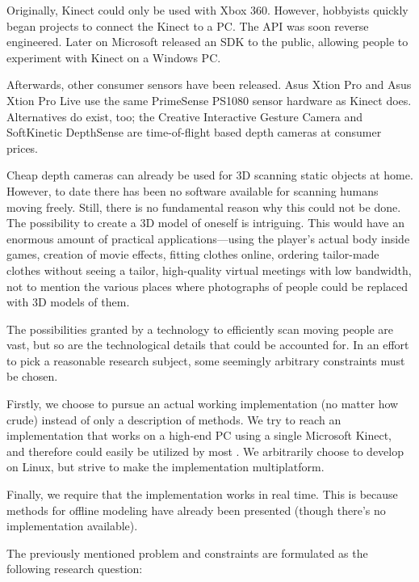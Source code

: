 Originally, Kinect could only be used with Xbox 360. However, hobbyists quickly began projects to connect the Kinect to a PC. The API was soon reverse engineered. Later on Microsoft released an SDK to the public, allowing people to experiment with Kinect on a Windows PC.

Afterwards, other consumer sensors have been released. Asus Xtion Pro and Asus Xtion Pro Live use the same PrimeSense PS1080 sensor hardware as Kinect does. Alternatives do exist, too; the Creative Interactive Gesture Camera and SoftKinetic DepthSense are time-of-flight based depth cameras at consumer prices.

Cheap depth cameras can already be used for 3D scanning static objects at home. However, to date there has been no software available for scanning humans moving freely. Still, there is no fundamental reason why this could not be done. The possibility to create a 3D model of oneself is intriguing. This would have an enormous amount of practical applications---using the player's actual body inside games, creation of movie effects, fitting clothes online, ordering tailor-made clothes without seeing a tailor, high-quality virtual meetings with low bandwidth, not to mention the various places where photographs of people could be replaced with 3D models of them.


The possibilities granted by a technology to efficiently scan moving people are vast, but so are the technological details that could be accounted for. In an effort to pick a reasonable research subject, some seemingly arbitrary constraints must be chosen.

Firstly, we choose to pursue an actual working implementation (no matter how crude) instead of only a description of methods. We try to reach an implementation that works on a high-end PC using a single Microsoft Kinect, and therefore could easily be utilized by most . We arbitrarily choose to develop on Linux, but strive to make the implementation multiplatform.

Finally, we require that the implementation works in real time. This is because methods for offline modeling have already been presented (though there's no implementation available).

The previously mentioned problem and constraints are formulated as the following research question:

 
